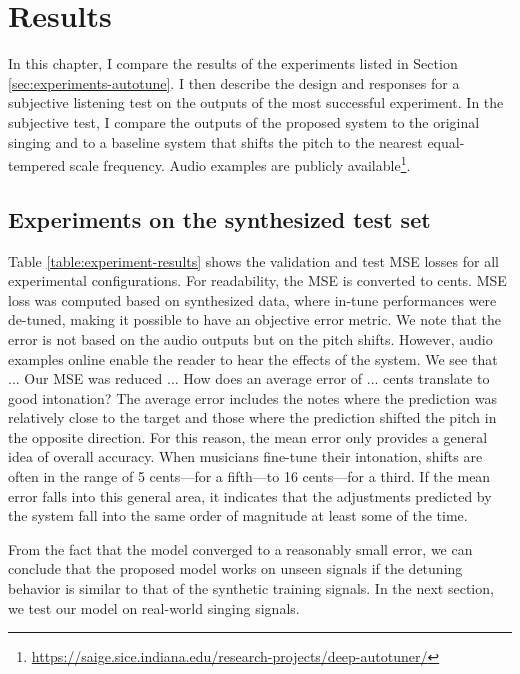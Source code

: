 \chapter{Results}
\label{chap:results}
In this chapter, I compare the results of the experiments listed in Section \ref{sec:experiments-autotune}. I then describe the design and responses for a subjective listening test on the outputs of the most successful experiment. In the subjective test, I compare the outputs of the proposed system to the original singing and to a baseline system that shifts the pitch to the nearest equal-tempered scale frequency. Audio examples are publicly available\footnote{\href{https://saige.sice.indiana.edu/research-projects/deep-autotuner/}{https://saige.sice.indiana.edu/research-projects/deep-autotuner/}}.

\section{Experiments on the synthesized test set}
Table \ref{table:experiment-results} shows the validation and test MSE losses for all experimental configurations. For readability, the MSE is converted to cents. MSE loss was computed based on synthesized data, where in-tune performances were de-tuned, making it possible to have an objective error metric. We note that the error is not based on the audio outputs but on the pitch shifts. However, audio examples online enable the reader to hear the effects of the system. We see that ... Our MSE was reduced ...  How does an average error of ... cents translate to good intonation? The average error includes the notes where the prediction was relatively close to the target and those where the prediction shifted the pitch in the opposite direction. For this reason, the mean error only provides a general idea of overall accuracy. When musicians fine-tune their intonation, shifts are often in the range of 5 cents---for a fifth---to 16 cents---for a third. If the mean error falls into this general area, it indicates that the adjustments predicted by the system fall into the same order of magnitude at least some of the time. 

From the fact that the model converged to a reasonably small error, we can conclude that the proposed model works on unseen signals if the detuning behavior is similar to that of the synthetic training signals. In the next section, we test our model on real-world singing signals.

